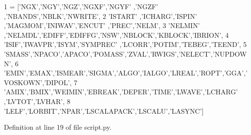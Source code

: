 \begin{DoxyCode}
1 = [\textcolor{stringliteral}{'NGX'},\textcolor{stringliteral}{'NGY'},\textcolor{stringliteral}{'NGZ'},\textcolor{stringliteral}{'NGXF'},\textcolor{stringliteral}{'NGYF'} ,\textcolor{stringliteral}{'NGZF'} ,\textcolor{stringliteral}{'NBANDS'},\textcolor{stringliteral}{'NBLK'},\textcolor{stringliteral}{'NWRITE'}, 
2 \textcolor{stringliteral}{'ISTART'} ,\textcolor{stringliteral}{'ICHARG'},\textcolor{stringliteral}{'ISPIN'} ,\textcolor{stringliteral}{'MAGMOM'},\textcolor{stringliteral}{'INIWAV'},\textcolor{stringliteral}{'ENCUT'} ,\textcolor{stringliteral}{'PREC'},\textcolor{stringliteral}{'NELM'}, 
3 \textcolor{stringliteral}{'NELMIN'} ,\textcolor{stringliteral}{'NELMDL'},\textcolor{stringliteral}{'EDIFF'},\textcolor{stringliteral}{'EDIFFG'},\textcolor{stringliteral}{'NSW'},\textcolor{stringliteral}{'NBLOCK'},\textcolor{stringliteral}{'KBLOCK'},\textcolor{stringliteral}{'IBRION'}, 
4 \textcolor{stringliteral}{'ISIF'},\textcolor{stringliteral}{'IWAVPR'},\textcolor{stringliteral}{'ISYM'},\textcolor{stringliteral}{'SYMPREC'} ,\textcolor{stringliteral}{'LCORR'},\textcolor{stringliteral}{'POTIM'},\textcolor{stringliteral}{'TEBEG'},\textcolor{stringliteral}{'TEEND'}, 
5 \textcolor{stringliteral}{'SMASS'},\textcolor{stringliteral}{'NPACO'},\textcolor{stringliteral}{'APACO'},\textcolor{stringliteral}{'POMASS'},\textcolor{stringliteral}{'ZVAL'},\textcolor{stringliteral}{'RWIGS'},\textcolor{stringliteral}{'NELECT'},\textcolor{stringliteral}{'NUPDOWN'}, 
6 \textcolor{stringliteral}{'EMIN'},\textcolor{stringliteral}{'EMAX'},\textcolor{stringliteral}{'ISMEAR'},\textcolor{stringliteral}{'SIGMA'},\textcolor{stringliteral}{'ALGO'},\textcolor{stringliteral}{'IALGO'},\textcolor{stringliteral}{'LREAL'},\textcolor{stringliteral}{'ROPT'},\textcolor{stringliteral}{'GGA'},\textcolor{stringliteral}{'VOSKOWN'},\textcolor{stringliteral}{'DIPOL'}, 
7 \textcolor{stringliteral}{'AMIX'},\textcolor{stringliteral}{'BMIX'},\textcolor{stringliteral}{'WEIMIN'},\textcolor{stringliteral}{'EBREAK'},\textcolor{stringliteral}{'DEPER'},\textcolor{stringliteral}{'TIME'},\textcolor{stringliteral}{'LWAVE'},\textcolor{stringliteral}{'LCHARG'} ,\textcolor{stringliteral}{'LVTOT'},\textcolor{stringliteral}{'LVHAR'}, 
8 \textcolor{stringliteral}{'LELF'},\textcolor{stringliteral}{'LORBIT'},\textcolor{stringliteral}{'NPAR'},\textcolor{stringliteral}{'LSCALAPACK'},\textcolor{stringliteral}{'LSCALU'},\textcolor{stringliteral}{'LASYNC'}]
\end{DoxyCode}


Definition at line 19 of file script.\+py.

